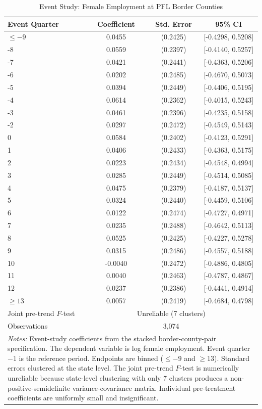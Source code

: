 \begin{table}[htbp]
\centering
\caption{Event Study: Female Employment at PFL Border Counties}
\label{tab:eventstudy}
\begin{tabular}{lccc}
\hline\hline
Event Quarter & Coefficient & Std. Error & 95\% CI \\
\hline
$\leq -9$ & 0.0455 & (0.2425) & [-0.4298, 0.5208] \\
-8 & 0.0559 & (0.2397) & [-0.4140, 0.5257] \\
-7 & 0.0421 & (0.2441) & [-0.4363, 0.5206] \\
-6 & 0.0202 & (0.2485) & [-0.4670, 0.5073] \\
-5 & 0.0394 & (0.2449) & [-0.4406, 0.5195] \\
-4 & 0.0614 & (0.2362) & [-0.4015, 0.5243] \\
-3 & 0.0461 & (0.2396) & [-0.4235, 0.5158] \\
-2 & 0.0297 & (0.2472) & [-0.4549, 0.5143] \\
0 & 0.0584 & (0.2402) & [-0.4123, 0.5291] \\
1 & 0.0406 & (0.2433) & [-0.4363, 0.5175] \\
2 & 0.0223 & (0.2434) & [-0.4548, 0.4994] \\
3 & 0.0285 & (0.2449) & [-0.4514, 0.5085] \\
4 & 0.0475 & (0.2379) & [-0.4187, 0.5137] \\
5 & 0.0324 & (0.2440) & [-0.4459, 0.5106] \\
6 & 0.0122 & (0.2474) & [-0.4727, 0.4971] \\
7 & 0.0235 & (0.2488) & [-0.4642, 0.5113] \\
8 & 0.0525 & (0.2425) & [-0.4227, 0.5278] \\
9 & 0.0315 & (0.2486) & [-0.4557, 0.5188] \\
10 & -0.0040 & (0.2472) & [-0.4886, 0.4805] \\
11 & 0.0040 & (0.2463) & [-0.4787, 0.4867] \\
12 & 0.0237 & (0.2386) & [-0.4441, 0.4914] \\
$\geq 13$ & 0.0057 & (0.2419) & [-0.4684, 0.4798] \\
\hline
Joint pre-trend $F$-test & \multicolumn{3}{c}{Unreliable (7 clusters)} \\
Observations & \multicolumn{3}{c}{3,074} \\
\hline\hline
\multicolumn{4}{p{0.85\textwidth}}{\footnotesize \textit{Notes:} Event-study coefficients from the stacked border-county-pair specification. The dependent variable is log female employment. Event quarter $-1$ is the reference period. Endpoints are binned ($\leq -9$ and $\geq 13$). Standard errors clustered at the state level. The joint pre-trend $F$-test is numerically unreliable because state-level clustering with only 7 clusters produces a non-positive-semidefinite variance-covariance matrix. Individual pre-treatment coefficients are uniformly small and insignificant.} \\
\end{tabular}
\end{table}

